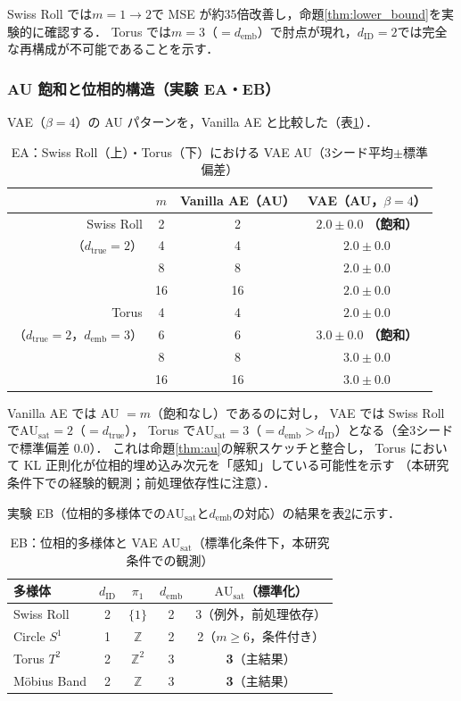 \documentclass[11pt,a4paper]{jsarticle}
\newcommand{\dID}{d_{\mathrm{ID}}}
\newcommand{\dtrue}{d_{\mathrm{true}}}
\newcommand{\AUsat}{\mathrm{AU}_{\mathrm{sat}}}
\newcommand{\demb}{d_{\mathrm{emb}}}
\begin{document}
Swiss Roll では$m = 1 \to 2$で MSE が約35倍改善し，命題\ref{thm:lower_bound}を実験的に確認する．
Torus では$m = 3$（$= \demb$）で肘点が現れ，$\dID = 2$では完全な再構成が不可能であることを示す．

\subsubsection{AU 飽和と位相的構造（実験 EA・EB）}

VAE（$\beta = 4$）の AU パターンを，Vanilla AE と比較した（表\ref{tab:ea_summary}）．

\begin{table}[H]
\centering
\caption{EA：Swiss Roll（上）・Torus（下）における VAE AU（3シード平均$\pm$標準偏差）}
\label{tab:ea_summary}
\small
\begin{tabular}{rccc}
\toprule
 & $m$ & Vanilla AE（AU） & VAE（AU，$\beta=4$） \\
\midrule
Swiss Roll & 2 & 2 & $2.0\pm0.0$ \textbf{（飽和）} \\
（$\dtrue = 2$） & 4 & 4 & $2.0\pm0.0$ \\
 & 8 & 8 & $2.0\pm0.0$ \\
 & 16 & 16 & $2.0\pm0.0$ \\
\midrule
Torus & 4 & 4 & $2.0\pm0.0$ \\
（$\dtrue = 2$，$\demb = 3$） & 6 & 6 & $3.0\pm0.0$ \textbf{（飽和）} \\
 & 8 & 8 & $3.0\pm0.0$ \\
 & 16 & 16 & $3.0\pm0.0$ \\
\bottomrule
\end{tabular}
\end{table}

Vanilla AE では AU $= m$（飽和なし）であるのに対し，
VAE では Swiss Roll で$\AUsat = 2$（$= \dtrue$），
Torus で$\AUsat = 3$（$= \demb > \dID$）となる（全3シードで標準偏差 0.0）．
これは命題\ref{thm:au}の解釈スケッチと整合し，
Torus において KL 正則化が位相的埋め込み次元を「感知」している可能性を示す
（本研究条件下での経験的観測；前処理依存性に注意）．

実験 EB（位相的多様体での$\AUsat$と$\demb$の対応）の結果を表\ref{tab:eb_summary}に示す．

\begin{table}[H]
\centering
\caption{EB：位相的多様体と VAE $\AUsat$（標準化条件下，本研究条件での観測）}
\label{tab:eb_summary}
\small
\begin{tabular}{lcccc}
\toprule
多様体 & $\dID$ & $\pi_1$ & $\demb$ & $\AUsat$（標準化） \\
\midrule
Swiss Roll   & 2 & $\{1\}$        & 2 & 3（例外，前処理依存）\\
Circle $S^1$ & 1 & $\mathbb{Z}$   & 2 & 2（$m \geq 6$，条件付き）\\
Torus $T^2$  & 2 & $\mathbb{Z}^2$ & 3 & \textbf{3}（主結果）\\
Möbius Band  & 2 & $\mathbb{Z}$   & 3 & \textbf{3}（主結果）\\
\bottomrule
\end{tabular}
\end{table}
\end{document}
